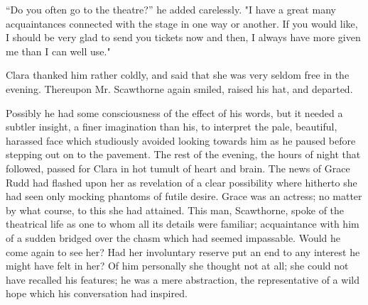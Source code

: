``Do you often go to the theatre?'' he added carelessly. "I have a great
many acquaintances connected with the stage in one way or another. If
you would like, I should be {}very glad to send you tickets now and
then, I always have more given me than I can well use."

Clara thanked him rather coldly, and said that she was very seldom free
in the evening. Thereupon Mr. Scawthorne again smiled, raised his hat,
and departed.

Possibly he had some consciousness of the effect of his words, but it
needed a subtler insight, a finer imagination than his, to interpret the
pale, beautiful, harassed face which studiously avoided looking towards
him as he paused before stepping out on to the pavement. The rest of the
evening, the hours of night that followed, passed for Clara in hot
tumult of heart and brain. The news of Grace Rudd had flashed upon her
as revelation of a clear possibility where hitherto she had seen only
mocking phantoms of futile desire. Grace was an actress; no matter by
what course, to this she had attained. This man, Scawthorne, spoke of
the theatrical life as one to whom all its details were familiar;
acquaintance with him of a sudden bridged over the {}chasm which had
seemed impassable. Would he come again to see her? Had her involuntary
reserve put an end to any interest he might have felt in her? Of him
personally she thought not at all; she could not have recalled his
features; he was a mere abstraction, the representative of a wild hope
which his conversation had inspired.

